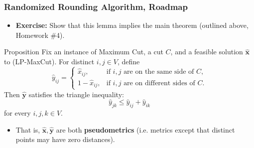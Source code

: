 \documentclass{beamer}
\begin{document}
    \begin{frame}
        \frametitle{Randomized Rounding Algorithm, Roadmap}

        \begin{itemize}
            \item {\bf Exercise:} Show that this lemma implies the main theorem (outlined above, Homework \#4).
        \end{itemize}

        \pause

        \begin{block}{Proposition}
            Fix an instance of {\sc Maximum Cut}, a cut $C$, and a feasible solution $\mathbf{\hat x}$ to {\sc (LP-MaxCut)}. For distinct $i, j \in V$, define
            $$ \hat y_{ij} = \left\{
                \begin{array}{ll}
                    \hat x_{ij}, & \text{if $i, j$ are on the same side of $C$}, \\
                    1 - \hat x_{ij}, & \text{if $i, j$ are on different sides of $C$}.
                \end{array}
            \right. $$
            Then $\mathbf {\hat y}$ satisfies the triangle inequality:
            $$ \hat y_{jk} \leq \hat y_{ij} + \hat y_{ik} $$
            for every $i, j, k \in V$.
        \end{block}

        \pause

        \begin{itemize}
            \item That is, $\mathbf{\hat x}, \mathbf{\hat y}$ are both {\bf pseudometrics} (i.e. metrics except that distinct points may have zero distances).
        \end{itemize}
    \end{frame}
\end{document}
